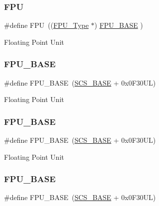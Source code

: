 \subsubsection{\texorpdfstring{FPU}{FPU}\hspace{0.1cm}{\footnotesize\ttfamily [4/4]}}
{\footnotesize\ttfamily \#define F\+PU~((\mbox{\hyperlink{struct_f_p_u___type}{F\+P\+U\+\_\+\+Type}}       $\ast$)     \mbox{\hyperlink{group___c_m_s_i_s__core__base_ga4dcad4027118c098c07bcd575f1fbb28}{F\+P\+U\+\_\+\+B\+A\+SE}}         )}

Floating Point Unit \mbox{\label{group___c_m_s_i_s__core__base_ga4dcad4027118c098c07bcd575f1fbb28}} 
\subsubsection{\texorpdfstring{FPU\_BASE}{FPU\_BASE}\hspace{0.1cm}{\footnotesize\ttfamily [1/4]}}
{\footnotesize\ttfamily \#define F\+P\+U\+\_\+\+B\+A\+SE~(\mbox{\hyperlink{group___c_m_s_i_s__core__base_ga3c14ed93192c8d9143322bbf77ebf770}{S\+C\+S\+\_\+\+B\+A\+SE}} +  0x0\+F30\+U\+L)}

Floating Point Unit \mbox{\label{group___c_m_s_i_s__core__base_ga4dcad4027118c098c07bcd575f1fbb28}} 
\subsubsection{\texorpdfstring{FPU\_BASE}{FPU\_BASE}\hspace{0.1cm}{\footnotesize\ttfamily [2/4]}}
{\footnotesize\ttfamily \#define F\+P\+U\+\_\+\+B\+A\+SE~(\mbox{\hyperlink{group___c_m_s_i_s__core__base_ga3c14ed93192c8d9143322bbf77ebf770}{S\+C\+S\+\_\+\+B\+A\+SE}} +  0x0\+F30\+U\+L)}

Floating Point Unit \mbox{\label{group___c_m_s_i_s__core__base_ga4dcad4027118c098c07bcd575f1fbb28}} 
\subsubsection{\texorpdfstring{FPU\_BASE}{FPU\_BASE}\hspace{0.1cm}{\footnotesize\ttfamily [3/4]}}
{\footnotesize\ttfamily \#define F\+P\+U\+\_\+\+B\+A\+SE~(\mbox{\hyperlink{group___c_m_s_i_s__core__base_ga3c14ed93192c8d9143322bbf77ebf770}{S\+C\+S\+\_\+\+B\+A\+SE}} +  0x0\+F30\+U\+L)}

